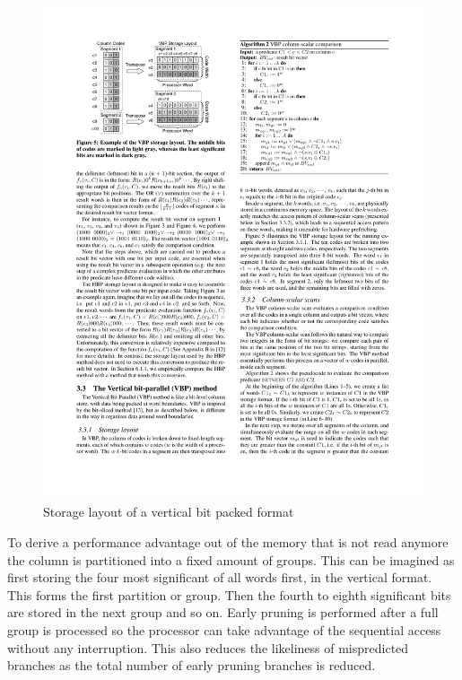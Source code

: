 \begin{figure}[h] \begin{center}
\includegraphics[scale=1.5]{images/bwv}
\end{center}
\caption{Storage layout of a vertical bit packed format~\cite{BitWeaving}}
\label{fig:bwv}
\end{figure}

To derive a performance advantage out of the memory that is not read anymore the
column is partitioned into a fixed amount of groups. This can be imagined as
first storing the four most significant of all words first, in the vertical
format. This forms the first partition or group. Then the fourth to eighth
significant bits are stored in the next group and so on. Early pruning is
performed after a full group is processed so the processor can take advantage of
the sequential access without any interruption. This also reduces the likeliness
of mispredicted branches as the total number of early pruning branches is
reduced.

